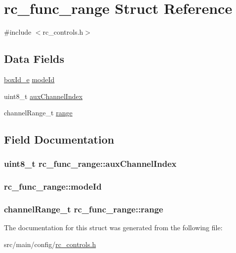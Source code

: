 \hypertarget{structrc__func__range}{\section{rc\+\_\+func\+\_\+range Struct Reference}
\label{structrc__func__range}
}


{\ttfamily \#include $<$rc\+\_\+controls.\+h$>$}

\subsection*{Data Fields}
\begin{DoxyCompactItemize}
\item 
\hyperlink{rc__controls_8h_a204cb52657be464220db4dca1fcf9045}{box\+Id\+\_\+e} \hyperlink{structrc__func__range_a934fc6031627cee392cde09f62b5b85f}{mode\+Id}
\item 
uint8\+\_\+t \hyperlink{structrc__func__range_a788973011cb90ef57d4645b30156610a}{aux\+Channel\+Index}
\item 
channel\+Range\+\_\+t \hyperlink{structrc__func__range_ad898910e8866bbb0fe553e5a4ee5dbaa}{range}
\end{DoxyCompactItemize}


\subsection{Field Documentation}
\hypertarget{structrc__func__range_a788973011cb90ef57d4645b30156610a}{
\subsubsection[{aux\+Channel\+Index}]{\setlength{\rightskip}{0pt plus 5cm}uint8\+\_\+t rc\+\_\+func\+\_\+range\+::aux\+Channel\+Index}}\label{structrc__func__range_a788973011cb90ef57d4645b30156610a}
\hypertarget{structrc__func__range_a934fc6031627cee392cde09f62b5b85f}{
\subsubsection[{mode\+Id}]{ rc\+\_\+func\+\_\+range\+::mode\+Id}}\label{structrc__func__range_a934fc6031627cee392cde09f62b5b85f}
\hypertarget{structrc__func__range_ad898910e8866bbb0fe553e5a4ee5dbaa}{
\subsubsection[{range}]{\setlength{\rightskip}{0pt plus 5cm}channel\+Range\+\_\+t rc\+\_\+func\+\_\+range\+::range}}\label{structrc__func__range_ad898910e8866bbb0fe553e5a4ee5dbaa}


The documentation for this struct was generated from the following file\+:\begin{DoxyCompactItemize}
\item 
src/main/config/\hyperlink{rc__controls_8h}{rc\+\_\+controls.\+h}\end{DoxyCompactItemize}
